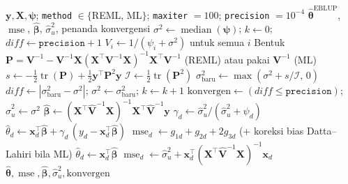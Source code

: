 \documentclass[11pt,a4paper]{article}
\theoremstyle{definition}
\begin{document}
\begin{algorithm}[H]
\caption{\texttt{eblup\_fh}: EBLUP Fay--Herriot via \emph{Fisher-scoring}}
\label{alg:fh}
\begin{algorithmic}[1]
\Require $\mathbf{y}, \mathbf{X}, \boldsymbol{\psi}$; \texttt{method} $\in\{$REML, ML$\}$;
  \texttt{maxiter} $= 100$; \texttt{precision} $= 10^{-4}$
\Ensure $\hat{\boldsymbol{\theta}}^{\text{EBLUP}}$, $\operatorname{mse}$,
  $\hat{\boldsymbol{\beta}}$, $\hat{\sigma}_u^2$, penanda konvergensi
\State $\sigma^2 \gets \operatorname{median}(\boldsymbol{\psi})$;
  $k \gets 0$; $\mathit{diff} \gets \texttt{precision} + 1$
  \State $V_i \gets 1/(\psi_i + \sigma^2)$ untuk semua $i$ 
  \State Bentuk $\mathbf{P} = \mathbf{V}^{-1} - \mathbf{V}^{-1}\mathbf{X}
    (\mathbf{X}^{\top}\mathbf{V}^{-1}\mathbf{X})^{-1}\mathbf{X}^{\top}\mathbf{V}^{-1}$
    (REML) atau pakai $\mathbf{V}^{-1}$ (ML)
  \State $s \gets -\tfrac{1}{2}\operatorname{tr}(\mathbf{P})
    + \tfrac{1}{2}\mathbf{y}^{\top}\mathbf{P}^2\mathbf{y}$ 
  \State $\mathcal{I} \gets \tfrac{1}{2}\operatorname{tr}(\mathbf{P}^2)$ 
  \State $\sigma^2_{\text{baru}} \gets \max(\sigma^2 + s/\mathcal{I},\, 0)$
  \State $\mathit{diff} \gets |\sigma^2_{\text{baru}} - \sigma^2|$;
    $\sigma^2 \gets \sigma^2_{\text{baru}}$; $k \gets k + 1$
\EndWhile
\State $\text{konvergen} \gets (\mathit{diff} \le \texttt{precision})$;
  $\hat{\sigma}_u^2 \gets \sigma^2$
\State $\hat{\boldsymbol{\beta}} \gets
  (\mathbf{X}^{\top}\hat{\mathbf{V}}^{-1}\mathbf{X})^{-1}
  \mathbf{X}^{\top}\hat{\mathbf{V}}^{-1}\mathbf{y}$ 
  \State $\gamma_d \gets \hat{\sigma}_u^2 / (\hat{\sigma}_u^2 + \psi_d)$
    \State $\hat{\theta}_d \gets \mathbf{x}_d^{\top}\hat{\boldsymbol{\beta}}
      + \gamma_d\,(y_d - \mathbf{x}_d^{\top}\hat{\boldsymbol{\beta}})$
    \State $\operatorname{mse}_d \gets g_{1d} + g_{2d} + 2g_{3d}$
      (+ koreksi bias Datta--Lahiri bila ML)
  \Else
    \State $\hat{\theta}_d \gets \mathbf{x}_d^{\top}\hat{\boldsymbol{\beta}}$
    \State $\operatorname{mse}_d \gets \hat{\sigma}_u^2 +
      \mathbf{x}_d^{\top}(\mathbf{X}^{\top}\hat{\mathbf{V}}^{-1}\mathbf{X})^{-1}\mathbf{x}_d$
  \EndIf
\EndFor
\State \Return $\hat{\boldsymbol{\theta}}, \operatorname{mse},
  \hat{\boldsymbol{\beta}}, \hat{\sigma}_u^2, \text{konvergen}$
\end{algorithmic}
\end{algorithm}
\end{document}
